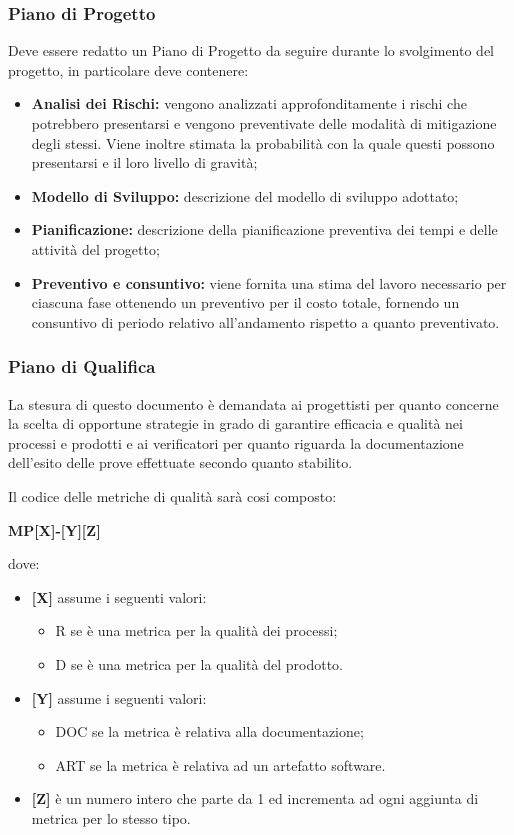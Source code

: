 \subsubsection{Piano di Progetto}
Deve essere redatto un Piano di Progetto da seguire durante lo svolgimento del progetto, in particolare deve contenere:

\begin{itemize}
  \item \textbf{Analisi dei Rischi:} vengono analizzati approfonditamente i rischi che potrebbero presentarsi e vengono preventivate delle modalità di mitigazione degli stessi. Viene inoltre stimata la probabilità con la quale questi possono presentarsi e il loro livello di gravità;
  \item \textbf{Modello di Sviluppo:} descrizione del modello di sviluppo adottato;
  \item \textbf{Pianificazione:} descrizione della pianificazione preventiva dei tempi e delle attività del progetto;
  \item \textbf{Preventivo e consuntivo:}  viene fornita una stima del lavoro necessario per ciascuna fase ottenendo un preventivo per il costo totale,  fornendo un consuntivo di periodo relativo all'andamento rispetto a quanto preventivato.
\end{itemize}

\subsubsection{Piano di Qualifica}
La stesura di questo documento è demandata ai progettisti per quanto concerne la scelta di opportune strategie in grado di garantire efficacia e qualità nei processi e prodotti e ai verificatori per quanto riguarda la documentazione dell'esito delle prove effettuate secondo quanto stabilito.

Il codice delle metriche di qualità sarà cosi composto:
\begin{center}
  \textbf{MP[X]-[Y][Z]}
\end{center}
dove:
\begin{itemize}
  \item \textbf{[X]} assume i seguenti valori:
  \begin{itemize}
    \item R se è una metrica per la qualità dei processi;
    \item D se è una metrica per la qualità del prodotto.
  \end{itemize}
  \item \textbf{[Y]} assume i seguenti valori:
  \begin{itemize}
    \item DOC se la metrica è relativa alla documentazione;
    \item ART se la metrica è relativa ad un artefatto software.
  \end{itemize}
  \item \textbf{[Z]} è un numero intero che parte da 1 ed incrementa ad ogni aggiunta di metrica per lo stesso tipo.
\end{itemize}


